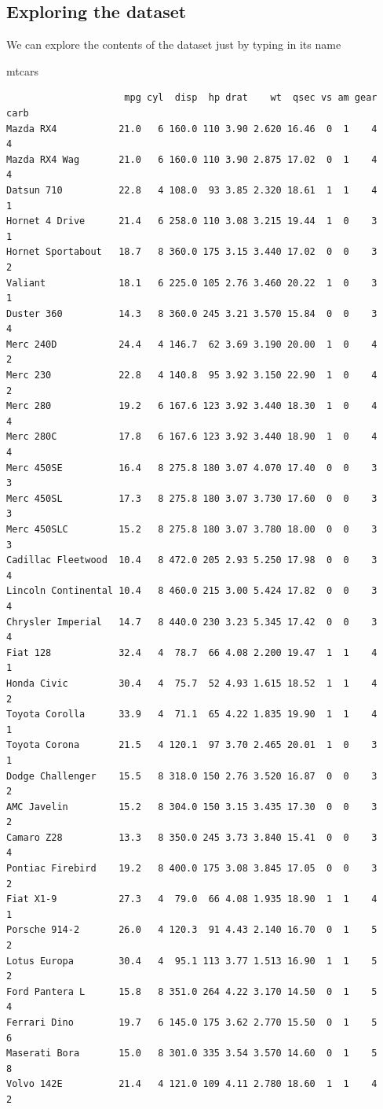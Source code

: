 \documentclass[
  letterpaper,
  DIV=11,
  numbers=noendperiod]{scrartcl}
\newenvironment{Shaded}{\begin{snugshade}}{\end{snugshade}}
\newcommand{\NormalTok}[1]{\textcolor[rgb]{0.00,0.23,0.31}{#1}}
\begin{document}
\subsection{Exploring the dataset}\label{exploring-the-dataset}

We can explore the contents of the dataset just by typing in its name

\begin{Shaded}
\begin{Highlighting}[]
\NormalTok{mtcars}
\end{Highlighting}
\end{Shaded}

\begin{verbatim}
                     mpg cyl  disp  hp drat    wt  qsec vs am gear carb
Mazda RX4           21.0   6 160.0 110 3.90 2.620 16.46  0  1    4    4
Mazda RX4 Wag       21.0   6 160.0 110 3.90 2.875 17.02  0  1    4    4
Datsun 710          22.8   4 108.0  93 3.85 2.320 18.61  1  1    4    1
Hornet 4 Drive      21.4   6 258.0 110 3.08 3.215 19.44  1  0    3    1
Hornet Sportabout   18.7   8 360.0 175 3.15 3.440 17.02  0  0    3    2
Valiant             18.1   6 225.0 105 2.76 3.460 20.22  1  0    3    1
Duster 360          14.3   8 360.0 245 3.21 3.570 15.84  0  0    3    4
Merc 240D           24.4   4 146.7  62 3.69 3.190 20.00  1  0    4    2
Merc 230            22.8   4 140.8  95 3.92 3.150 22.90  1  0    4    2
Merc 280            19.2   6 167.6 123 3.92 3.440 18.30  1  0    4    4
Merc 280C           17.8   6 167.6 123 3.92 3.440 18.90  1  0    4    4
Merc 450SE          16.4   8 275.8 180 3.07 4.070 17.40  0  0    3    3
Merc 450SL          17.3   8 275.8 180 3.07 3.730 17.60  0  0    3    3
Merc 450SLC         15.2   8 275.8 180 3.07 3.780 18.00  0  0    3    3
Cadillac Fleetwood  10.4   8 472.0 205 2.93 5.250 17.98  0  0    3    4
Lincoln Continental 10.4   8 460.0 215 3.00 5.424 17.82  0  0    3    4
Chrysler Imperial   14.7   8 440.0 230 3.23 5.345 17.42  0  0    3    4
Fiat 128            32.4   4  78.7  66 4.08 2.200 19.47  1  1    4    1
Honda Civic         30.4   4  75.7  52 4.93 1.615 18.52  1  1    4    2
Toyota Corolla      33.9   4  71.1  65 4.22 1.835 19.90  1  1    4    1
Toyota Corona       21.5   4 120.1  97 3.70 2.465 20.01  1  0    3    1
Dodge Challenger    15.5   8 318.0 150 2.76 3.520 16.87  0  0    3    2
AMC Javelin         15.2   8 304.0 150 3.15 3.435 17.30  0  0    3    2
Camaro Z28          13.3   8 350.0 245 3.73 3.840 15.41  0  0    3    4
Pontiac Firebird    19.2   8 400.0 175 3.08 3.845 17.05  0  0    3    2
Fiat X1-9           27.3   4  79.0  66 4.08 1.935 18.90  1  1    4    1
Porsche 914-2       26.0   4 120.3  91 4.43 2.140 16.70  0  1    5    2
Lotus Europa        30.4   4  95.1 113 3.77 1.513 16.90  1  1    5    2
Ford Pantera L      15.8   8 351.0 264 4.22 3.170 14.50  0  1    5    4
Ferrari Dino        19.7   6 145.0 175 3.62 2.770 15.50  0  1    5    6
Maserati Bora       15.0   8 301.0 335 3.54 3.570 14.60  0  1    5    8
Volvo 142E          21.4   4 121.0 109 4.11 2.780 18.60  1  1    4    2
\end{verbatim}
\end{document}
